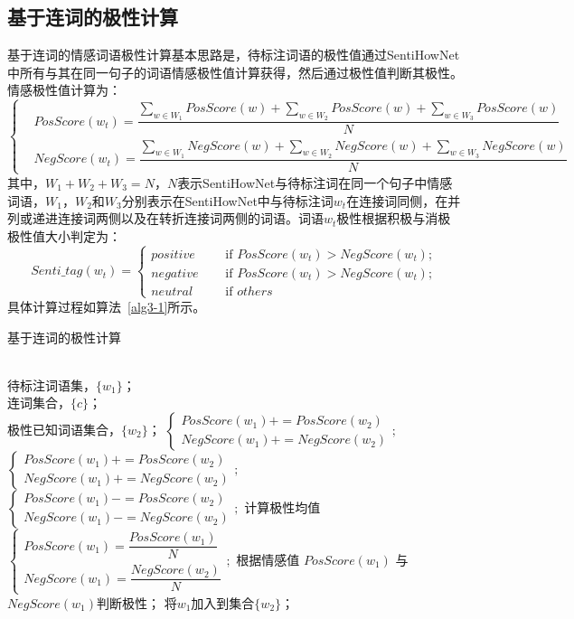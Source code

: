 \subsection{基于连词的极性计算}
基于连词的情感词语极性计算基本思路是，待标注词语的极性值通过SentiHowNet中所有与其在同一句子的词语情感极性值计算获得，然后通过极性值判断其极性。情感极性值计算为：
\begin{equation}
\begin{cases}
& PosScore(w_t)=\dfrac{\sum_{w \in W_1}PosScore(w)+\sum_{w \in W_2}PosScore(w)+\sum_{w \in W_3}PosScore(w)}{N} \\
& NegScore(w_t)=\dfrac{\sum_{w \in W_1}NegScore(w)+\sum_{w \in W_2}NegScore(w)+\sum_{w \in W_3}NegScore(w)}{N}
\end{cases}
\end{equation}
其中，$W_1+W_2+W_3=N$，$N$表示SentiHowNet与待标注词在同一个句子中情感词语，$W_1$，$W_2$和$W_3$分别表示在SentiHowNet中与待标注词$w_t$在连接词同侧，在并列或递进连接词两侧以及在转折连接词两侧的词语。词语$w_t$极性根据积极与消极极性值大小判定为：
\begin{equation}
\label{eq3-2}
Senti\_tag(w_t)=
\begin{cases}
 positive \quad & \text{ if } PosScore(w_t)> NegScore(w_t); \\ 
 negative \quad &\text{ if } PosScore(w_t)> NegScore(w_t);  \\ 
 neutral  \quad &\text{ if } others
\end{cases}
\end{equation}
具体计算过程如算法~\ref{alg3-1}所示。
\begin{algorithm}[htp]
\caption{基于连词的极性计算}
\label{alg3-1}
\begin{algorithmic}[1]
\REQUIRE ~~\\
待标注词语集，$\{w_1\}$；\\
连词集合，$\{c\}$；\\
极性已知词语集合，$\{w_2\}$；
\STATE $
\begin{cases}
PosScore(w_1)+=PosScore(w_2)\\
NegScore(w_1)+=NegScore(w_2)
\end{cases};$
\ELSE
{}
\STATE $
\begin{cases}
PosScore(w_1)+=PosScore(w_2)\\
NegScore(w_1)+=NegScore(w_2)
\end{cases};$
\ENDIF
{}
\STATE $
\begin{cases}
PosScore(w_1)-=PosScore(w_2)\\
NegScore(w_1)-=NegScore(w_2)
\end{cases};$
\ENDIF
\ENDIF
\ENDFOR
\STATE 计算极性均值$
\begin{cases}
PosScore(w_1)=\dfrac{PosScore(w_1)}{N}\\
NegScore(w_1)=\dfrac{NegScore(w_2)}{N}
\end{cases};$
\STATE 根据情感值 $PosScore(w_1)$ 与$ NegScore(w_1) $判断极性；
\STATE 将$ w_1 $加入到集合$ \{w_2\} $；
\ENDFOR
\end{algorithmic}
\end{algorithm}

